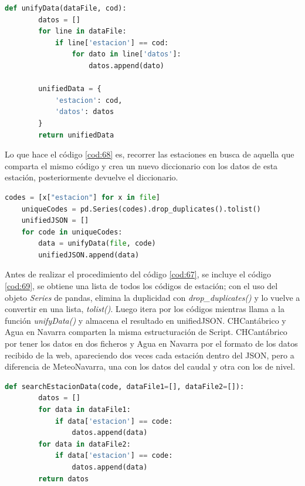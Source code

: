 \begin{lstlisting}[language=Python, caption={Declaración función \textit{unifyData()} para el correcto funcionamiento del formateo de MeteoNavarra}, label=cod:68]
	def unifyData(dataFile, cod):
		datos = []
		for line in dataFile:
			if line['estacion'] == cod:
				for dato in line['datos']:
					datos.append(dato)
		
		unifiedData = {
			'estacion': cod,
			'datos': datos
		}
		return unifiedData
\end{lstlisting}

Lo que hace el código \ref{cod:68} es, recorrer las estaciones en busca de aquella que comparta el mismo código y crea un nuevo diccionario con los datos de esta estación, posteriormente devuelve el diccionario.

\begin{lstlisting}[language=Python, caption={Paso inicial en la función \textit{formatData()} de MeteoNavarra}, label=cod:69]
	codes = [x["estacion"] for x in file]
	uniqueCodes = pd.Series(codes).drop_duplicates().tolist()
	unifiedJSON = []
	for code in uniqueCodes:
		data = unifyData(file, code)
		unifiedJSON.append(data)
\end{lstlisting}

Antes de realizar el procedimiento del código \ref{cod:67}, se incluye el código \ref{cod:69}, se obtiene una lista de todos los códigos de estación; con el uso del objeto \textit{Series} de pandas, elimina la duplicidad con \textit{drop\_duplicates()} y lo vuelve a convertir en una lista, \textit{tolist()}. Luego itera por los códigos mientras llama a la función \textit{unifyData()} y almacena el resultado en unifiedJSON.\newline
\newline
CHCantábrico y Agua en Navarra comparten la misma estructuración de Script. CHCantábrico por tener los datos en dos ficheros y Agua en Navarra por el formato de los datos recibido de la web, apareciendo dos veces cada estación dentro del JSON, pero a diferencia de MeteoNavarra, una con los datos del caudal y otra con los de nivel.

\begin{lstlisting}[language=Python, caption={Declaración función \textit{searchEstacionData()}, especifica en el formateo de datos de CHCantábrico y Agua en Navarra}, label=cod:70]
	def searchEstacionData(code, dataFile1=[], dataFile2=[]):
		datos = []
		for data in dataFile1:
			if data['estacion'] == code:
				datos.append(data)
		for data in dataFile2:
			if data['estacion'] == code:
				datos.append(data)
		return datos
\end{lstlisting}

